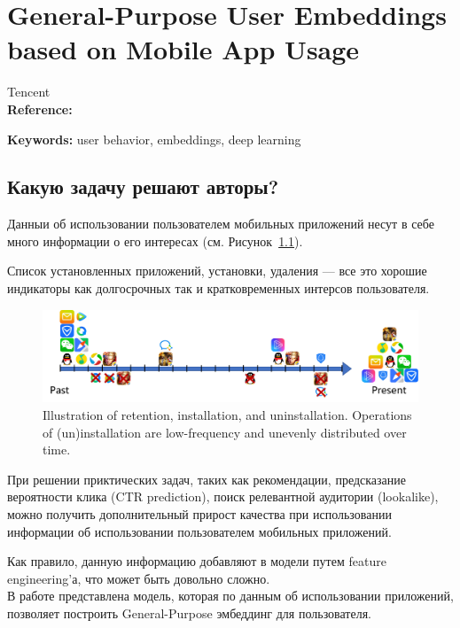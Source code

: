 \chapter{General-Purpose User Embeddings based on Mobile App Usage}

Tencent \\

\textbf{Reference:}~\cite{zhang2020general} 

\textbf{Keywords:} user behavior, embeddings, deep learning

\section{Какую задачу решают авторы?}

Данныи об использовании пользователем мобильных приложений несут в себе много информации о его интересах (см. Рисунок~\ref{fig:behaviors}). 

Список установленных приложений, установки, удаления --- все это хорошие индикаторы как долгосрочных так и кратковременных интерсов пользователя. \\

\begin{figure}[ht]
  \centering
  \includegraphics[width=0.8\linewidth]{figures/behaviors.pdf}
  \caption{\footnotesize{Illustration of retention, installation, and uninstallation. Operations of (un)installation are low-frequency and unevenly distributed over time.}}
  \label{fig:behaviors}
\end{figure}

При решении приктических задач, таких как рекомендации, предсказание вероятности клика (CTR prediction), поиск релевантной аудитории (lookalike), можно получить дополнительный прирост качества при использовании информации об использовании пользователем мобильных приложений.

Как правило, данную информацию добавляют в модели путем feature engineering'а, что может быть довольно сложно.  \\

В работе представлена модель, которая по данным об использовании приложений, позволяет построить General-Purpose эмбеддинг для пользователя.

